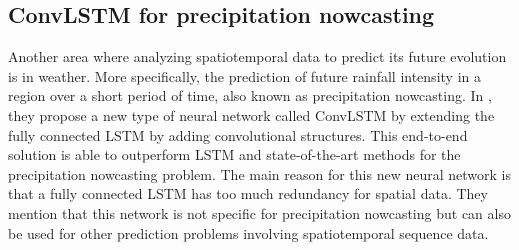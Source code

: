 \subsection*{\textbf{ConvLSTM for precipitation nowcasting}}
Another area where analyzing spatiotemporal data to predict its future evolution is in weather. More specifically, the prediction of future rainfall intensity in a region over a short period of time, also known as precipitation nowcasting. In \cite{shi_convolutional_2015}, they propose a new type of neural network called ConvLSTM by extending the fully connected LSTM by adding convolutional structures. This end-to-end solution is able to outperform LSTM and state-of-the-art methods for the precipitation nowcasting problem. The main reason for this new neural network is that a fully connected LSTM has too much redundancy for spatial data. They mention that this network is not specific for precipitation nowcasting but can also be used for other prediction problems involving spatiotemporal sequence data.

